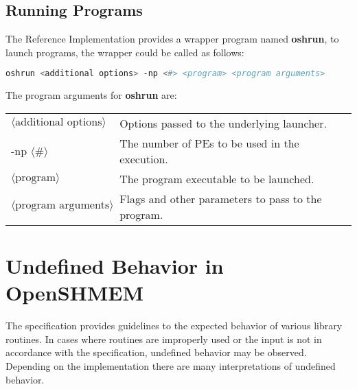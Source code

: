 \section{Running Programs}

The  \openshmem Reference Implementation provides a wrapper program named
\textbf{oshrun}, to launch \openshmem programs, the wrapper could be called as
follows:

\begin{lstlisting}[language=bash]
oshrun <additional options> -np <#> <program> <program arguments>
\end{lstlisting}
The program arguments for \textbf{oshrun} are:

\begin{tabular}{p{}p{}}
$\langle\mbox{additional options}\rangle$ & {Options passed to the underlying launcher.}\tabularnewline
-np $\langle\mbox{\#}\rangle$ & {The number of \acp{PE} to be used in the execution.}\tabularnewline
$\langle\mbox{program}\rangle$ & {The program executable to be launched.}\tabularnewline
$\langle\mbox{program arguments}\rangle$ & {Flags and other parameters to pass to the program.}\tabularnewline
\end{tabular}





\chapter{Undefined Behavior in OpenSHMEM}\label{sec:undefined}

The specification provides guidelines to the expected behavior of
various library routines.  In cases where routines are improperly used
or the input is not in accordance with the specification, undefined
behavior may be observed.  Depending on the implementation there are
many interpretations of undefined behavior. 

$\;$

